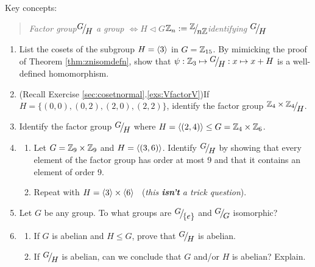 \begin{exercises}
	Key concepts:
	\begin{quote}
		\emph{Factor group\qquad $\quotient GH$ a group $\iff H\triangleleft G$\qquad $\Z_n:=\quotient{\Z}{n\Z}$\qquad identifying $\quotient GH$}
	\end{quote}
	
	\begin{enumerate}
	  \item List the cosets of the subgroup $H=\left\langle 3\right\rangle$ in $G=\mathbb{Z}_{15}$. By mimicking the proof of Theorem \ref{thm:znisomdefn}, show that $\psi:\Z_3\mapsto \quotient GH:x\mapsto x+H$ is a well-defined homomorphism.
	
		
		\item  (Recall Exercise \ref*{sec:cosetnormal}.\ref{exs:VfactorV})\lstsp If $H=\bigl\{(0,0),(0,2),(2,0),(2,2)\bigr\}$, identify the factor group $\quotient{\Z_4\times\Z_4}H$.
		
		
		\item Identify the factor group $\quotient GH$ where $H=\left\langle (2,4)\right\rangle\le G=\mathbb{Z}_4\times\mathbb{Z}_6$.
		
		
		\item\begin{enumerate}
		  \item Let $G=\mathbb{Z}_9\times\mathbb{Z}_9$ and $H=\left\langle (3,6)\right\rangle$. Identify $\quotient GH$ by showing that every element of the factor group has order at most 9 and that it contains an element of order 9.
		  
		  \item Repeat with $H=\left\langle 3\right\rangle\times\left\langle 6\right\rangle$ \ (\emph{this \textbf{isn't} a trick question}).
		\end{enumerate}
	  
	  
		\item Let $G$ be any group. To what groups are $\quotient G{\{e\}}$ and $\quotient GG$ isomorphic?
		
	
		\item\label{exs:gmodhabelian}\begin{enumerate}
		  \item If $G$ is abelian and $H\le G$, prove that $\quotient GH$ is abelian.
		  
		  \item If $\quotient GH$ is abelian, can we conclude that $G$ and/or $H$ is abelian? Explain.
		\end{enumerate}
		

\end{enumerate}
\end{exercises}
